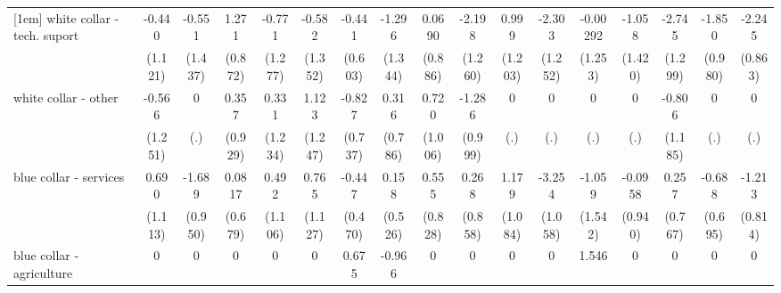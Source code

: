 {\begin{tabular}{l*{16}{c}}
[1em]
white collar - tech. suport&      -0.440         &      -0.551         &       1.271         &      -0.771         &      -0.582         &      -0.441         &      -1.296         &      0.0690         &      -2.198         &       0.999         &      -2.303         &    -0.00292         &      -1.058         &      -2.745\sym{*}  &      -1.850         &      -2.245\sym{**} \\
                    &     (1.121)         &     (1.437)         &     (0.872)         &     (1.277)         &     (1.352)         &     (0.603)         &     (1.344)         &     (0.886)         &     (1.260)         &     (1.203)         &     (1.252)         &     (1.253)         &     (1.420)         &     (1.299)         &     (0.980)         &     (0.863)         \\
[1em]
white collar - other&      -0.566         &           0         &       0.357         &       0.331         &       1.123         &      -0.827         &       0.316         &       0.720         &      -1.286         &           0         &           0         &           0         &           0         &      -0.806         &           0         &           0         \\
                    &     (1.251)         &         (.)         &     (0.929)         &     (1.234)         &     (1.247)         &     (0.737)         &     (0.786)         &     (1.006)         &     (0.999)         &         (.)         &         (.)         &         (.)         &         (.)         &     (1.185)         &         (.)         &         (.)         \\
[1em]
blue collar - services&       0.690         &      -1.689         &      0.0817         &       0.492         &       0.765         &      -0.447         &       0.158         &       0.555         &       0.268         &       1.179         &      -3.254\sym{**} &      -1.059         &     -0.0958         &       0.257         &      -0.688         &      -1.213         \\
                    &     (1.113)         &     (0.950)         &     (0.679)         &     (1.106)         &     (1.127)         &     (0.470)         &     (0.526)         &     (0.828)         &     (0.858)         &     (1.084)         &     (1.058)         &     (1.542)         &     (0.940)         &     (0.767)         &     (0.695)         &     (0.814)         \\
[1em]
blue collar - agriculture&           0         &           0         &           0         &           0         &           0         &       0.675         &      -0.966         &           0         &           0         &           0         &           0         &       1.546         &           0         &           0         &           0         &           0         \\

\end{tabular}}
